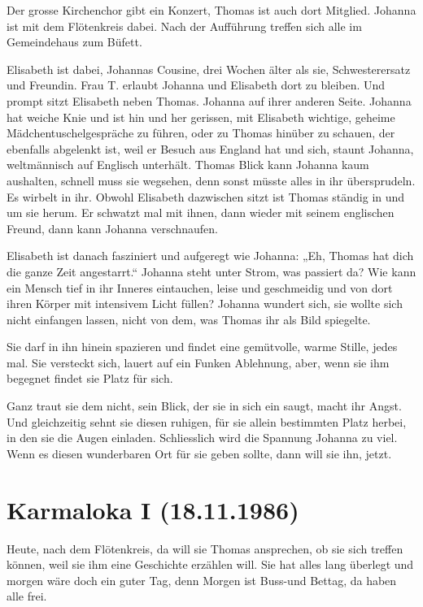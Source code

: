 \documentclass[10pt,titlepage,a5paper]{book}
\begin{document}
Der grosse Kirchenchor gibt ein Konzert, Thomas ist auch dort Mitglied. Johanna ist mit dem Flötenkreis dabei. Nach der Aufführung treffen sich alle im Gemeindehaus zum Büfett.

 Elisabeth ist dabei,  Johannas Cousine, drei Wochen älter als sie, Schwesterersatz und Freundin. Frau T. erlaubt Johanna und Elisabeth dort zu bleiben. Und prompt sitzt Elisabeth neben Thomas. Johanna auf ihrer anderen Seite. Johanna hat weiche Knie und ist hin und her gerissen, mit Elisabeth wichtige, geheime Mädchen\-tuschelgespräche zu führen, oder zu Thomas hinüber zu schauen, der ebenfalls abgelenkt ist, weil er Besuch aus England hat und sich, staunt Johanna, weltmännisch auf Englisch unterhält. 
Thomas Blick kann Johanna kaum aushalten, schnell muss sie wegsehen, denn sonst müsste alles in ihr übersprudeln. Es wirbelt in ihr. Obwohl Elisabeth dazwischen sitzt ist Thomas ständig in und um sie herum. Er schwatzt mal mit ihnen, dann wieder mit seinem englischen Freund, dann kann Johanna verschnaufen. 

Elisabeth ist danach fasziniert und aufgeregt wie Johanna: „Eh, Thomas hat dich die ganze Zeit angestarrt.“ Johanna steht unter Strom, was passiert da? Wie kann ein Mensch tief in ihr Inneres eintauchen, leise und geschmeidig und von dort ihren Körper mit intensivem Licht füllen? Johanna wundert sich, sie wollte sich nicht einfangen lassen, nicht von dem, was Thomas ihr als Bild spiegelte. 

Sie darf in ihn hinein spazieren und findet eine gemütvolle, warme Stille, jedes mal. Sie versteckt sich, lauert auf ein Funken Ablehnung, aber, wenn sie ihm begegnet findet sie Platz für sich. 

Ganz traut sie dem nicht, sein Blick, der sie in sich ein saugt, macht ihr Angst. Und gleichzeitig sehnt sie diesen ruhigen, für sie allein bestimmten Platz herbei, in den sie die Augen einladen. Schliesslich wird die Spannung Johanna zu viel. Wenn es diesen wunderbaren Ort für sie geben sollte, dann will sie ihn, jetzt.


\section*{Karmaloka I (18.11.1986)}


Heute, nach dem Flötenkreis, da will sie Thomas ansprechen, ob sie sich treffen können, weil sie ihm eine Geschichte erzählen will. Sie hat alles lang überlegt und morgen wäre doch ein guter Tag, denn Morgen ist Buss-und Bettag, da haben alle frei.
\end{document}
